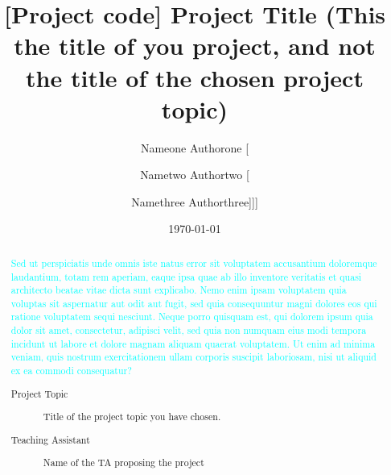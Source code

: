 \documentclass[%
 reprint,
 amsmath,amssymb,
 aps,
]{revtex4-2}
\begin{document}
\title{[Project code] Project Title (This the title of you project, and not the title of the chosen project topic)}%

\author{Nameone Authorone [}
\author{Nametwo Authortwo [}
\author{Namethree Authorthree]]]}

\date{\today}%

\begin{abstract} %
\noindent
{} 
\textcolor{cyan}{Sed ut perspiciatis unde omnis iste natus error sit voluptatem accusantium doloremque laudantium, totam rem aperiam, eaque ipsa quae ab illo inventore veritatis et quasi architecto beatae vitae dicta sunt explicabo. Nemo enim ipsam voluptatem quia voluptas sit aspernatur aut odit aut fugit, sed quia consequuntur magni dolores eos qui ratione voluptatem sequi nesciunt. Neque porro quisquam est, qui dolorem ipsum quia dolor sit amet, consectetur, adipisci velit, sed quia non numquam eius modi tempora incidunt ut labore et dolore magnam aliquam quaerat voluptatem. Ut enim ad minima veniam, quis nostrum exercitationem ullam corporis suscipit laboriosam, nisi ut aliquid ex ea commodi consequatur? }

\begin{description} %
\item[Project Topic] %
{Title of the project topic you have chosen.} %
\item[Teaching Assistant] %
{Name of the TA proposing the project} %
\end{description} %
\end{abstract}

\maketitle
\end{document}
